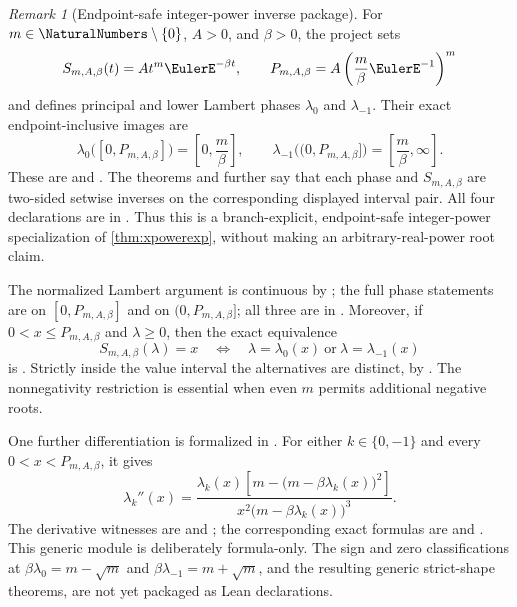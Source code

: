 \documentclass[11pt]{article}
\theoremstyle{remark}
\newtheorem{remark}[remark]{Remark}
\begin{document}
\begin{remark}[Endpoint-safe integer-power inverse package]
For \(m\in\NaturalNumbers\setminus\{0\}\), \(A>0\), and \(\beta>0\), the project sets
\[
 S_{m,A,\beta}(t)=At^m\EulerE^{-\beta t},
 \qquad
 P_{m,A,\beta}=A\left(\frac m\beta\EulerE^{-1}\right)^m
\]
and defines principal and lower Lambert phases \(\lambda_0\) and
\(\lambda_{-1}\).  Their exact endpoint-inclusive images are
\[
 \lambda_0\bigl([0,P_{m,A,\beta}]\bigr)
   =\left[0,\frac m\beta\right],
 \qquad
 \lambda_{-1}\bigl((0,P_{m,A,\beta}]\bigr)
   =\left[\frac m\beta,\infty\right].
\]
These are  and
.  The theorems
 and
 further say that each phase and
\(S_{m,A,\beta}\) are two-sided setwise inverses on the corresponding
displayed interval pair.  All four declarations are in
.  Thus this is a branch-explicit,
endpoint-safe integer-power specialization of \cref{thm:xpowerexp}, without
making an arbitrary-real-power root claim.

The normalized Lambert argument is continuous by
; the full phase statements
are  on
\([0,P_{m,A,\beta}]\) and
 on
\((0,P_{m,A,\beta}]\); all three are in
.  Moreover, if
\(0<x\leq P_{m,A,\beta}\) and \(\lambda\geq0\), then the exact equivalence
\[
 S_{m,A,\beta}(\lambda)=x
 \quad\Longleftrightarrow\quad
 \lambda=\lambda_0(x)\ \text{or}\ \lambda=\lambda_{-1}(x)
\]
is .  Strictly
inside the value interval the alternatives are distinct, by
.  The
nonnegativity restriction is essential when even \(m\) permits additional
negative roots.

One further differentiation is formalized in
.  For either
\(k\in\{0,-1\}\) and every \(0<x<P_{m,A,\beta}\), it gives
\begin{equation}\label{eq:power-exponential-phase-second-derivative}
 \lambda_k''(x)
 =\frac{\lambda_k(x)
   \left[m-\bigl(m-\beta\lambda_k(x)\bigr)^2\right]}
 {x^2\bigl(m-\beta\lambda_k(x)\bigr)^3}.
\end{equation}
The derivative witnesses are
 and
; the corresponding exact
formulas are  and
.  This generic module is
deliberately formula-only.  The sign and zero classifications at
\(\beta\lambda_0=m-\sqrt{m}\) and
\(\beta\lambda_{-1}=m+\sqrt{m}\), and the resulting generic strict-shape
theorems, are not yet packaged as Lean declarations.


\end{remark}
\end{document}
